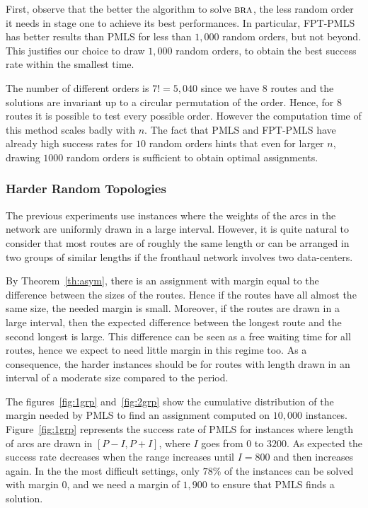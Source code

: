 \documentclass[a4paper,10pt]{article}
\newcommand\bra{\textsc{bra}\xspace}
\begin{document}
	First, observe that the better the algorithm to solve $\bra$, the less random order it needs in stage one to achieve its best performances. In particular, FPT-PMLS has better results than PMLS for less than $1,000$ random orders, but not beyond. This justifies our choice to draw $1,000$ random orders, to obtain the best success rate within the smallest time.

	The number of different orders is $7!= 5,040$ since we have $8$ routes and the solutions are invariant up to a circular permutation of the order. Hence, for $8$ routes it is possible to test every possible order. However the computation time of this method scales badly with $n$. The fact that PMLS and FPT-PMLS have already high success rates for $10$ random orders hints that even for larger $n$, drawing $1000$ random orders is sufficient to obtain optimal assignments.


     \subsubsection{Harder Random Topologies}
     
     The previous experiments use instances where the weights of the arcs in the network are uniformly drawn in a large interval. However, it is quite natural to consider that most routes are of roughly the same length or can be arranged in two groups of similar lengths if the fronthaul network involves two data-centers.
     
     By Theorem~\ref{th:asym}, there is an assignment with margin equal to the difference
     between the sizes of the routes. Hence if the routes have all almost the same size, the needed margin is small. Moreover, if the routes are drawn in a large interval, then the expected difference between the longest route and the second longest is large. This difference can be seen as a free waiting time for all routes, hence we expect to need little margin in this regime too. As a consequence, the harder instances should be for routes with length drawn in an interval of a moderate size compared to the period.
     
     The figures~\ref{fig:1grp} and~\ref{fig:2grp} show the cumulative distribution of the margin needed by PMLS to find an assignment computed on $10,000$ instances.
     Figure~\ref{fig:1grp} represents the success rate of PMLS for instances where length of arcs are drawn in $[P-I,P+I]$, where $I$ goes from $0$ to $3200$. As expected the success rate decreases when the range increases until $I = 800$ and then increases again.  In the the most difficult settings, only $78\%$ of the instances can be solved with margin $0$, and we need a margin of $1,900$ to ensure that PMLS finds a solution.
    
\end{document}
